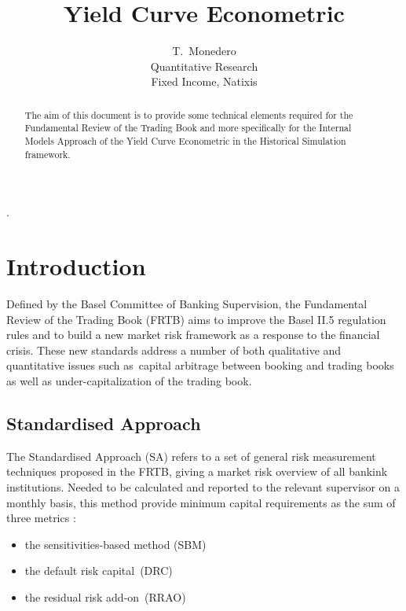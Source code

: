\documentclass[3pt]{article}
\begin{document}
\title{Yield Curve Econometric}
\author{T.\ Monedero \\
Quantitative Research\\
Fixed Income, Natixis\\
}
\maketitle

\begin{abstract}
The aim of this document is to provide some technical elements required for
the Fundamental Review of the Trading Book and more specifically for the
Internal Models Approach of the Yield Curve Econometric in the Historical
Simulation framework.
\end{abstract}

\tableofcontents

.

\bigskip

\bigskip

\bigskip

\section{Introduction}

Defined by the Basel Committee of Banking Supervision, the Fundamental
Review of the Trading Book (FRTB) aims to improve the Basel II.5 regulation
rules and to build a new market risk framework as a response to the
financial crisis. These new standards address a number of both qualitative
and quantitative issues such as\ capital arbitrage between booking and
trading books as well as under-capitalization of the trading book.

\subsection{Standardised Approach}

The Standardised Approach (SA) refers to a set of general risk measurement
techniques proposed in the FRTB, giving a market risk overview of all
bankink institutions. Needed to be calculated and reported to the relevant
supervisor on a monthly basis, this method provide minimum capital
requirements as the sum of three metrics :

\bigskip

\begin{itemize}
\item the sensitivities-based method (SBM)

\item the default risk capital\ (DRC)

\item the residual risk add-on\ (RRAO)
\end{itemize}
\end{document}
